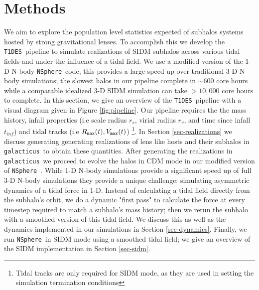 \documentclass[%
 reprint,
 amsmath,
 amssymb,
 aps,
]{revtex4-2}
\def\gal{{\tt galacticus}~}
\def\tides{{\tt T1DES}~}
\def\nsphere{{\tt NSphere}~}
\newcommand{\reffig}[1]{Figure \ref{#1}}
\newcommand{\refsec}[1]{Section \ref{#1}}
\begin{document}
\section{Methods}\label{sec-methods}

We aim to explore the population level statistics expected of subhalos systems hosted by strong gravitational lenses. 
To accomplish this we develop the \tides pipeline to simulate realizations of SIDM subhalos across various tidal fields and under the influence of a tidal field.
We use a modified version of the 1-D N-body \nsphere code, this provides a large speed up over traditional 3-D N-body simulations; the slowest halos in our pipeline complete in $\sim 600$ core hours while a comparable idealized 3-D SIDM simulation can take $> 10,000$ core hours to complete. 
In this section, we give an overview of the \tides pipeline with a visual diagram given in \reffig{fig:pipeline}.
Our pipeline requires the the mass history, infall properties (i.e scale radius $r_s$, virial radius $r_v$, and time since infall $t_{inf}$) and tidal tracks (i.e $R_{\tt max}(t), V_{\tt max}(t)$) 
\footnote{Tidal tracks are only required for SIDM mode, as they are used in setting the simulation termination conditions}. 
In \refsec{sec-realizations} we discuss generating generating realizations of lens like hosts and their subhalos in \gal to obtain these quantities.
After generating the realizations in \gal we proceed to evolve the halos in CDM mode in our modified version of \nsphere.
While 1-D N-body simulations provide a significant speed up of full 3-D N-body simulations they provide a unique challenge: simulating asymmetric dynamics of a tidal force in 1-D.
Instead of calculating a tidal field directly from the subhalo's orbit, we do a dynamic "first pass" to calculate the force at every timestep required to match a subhalo's mass history; then we rerun the subhalo with a smoothed version of this tidal field. 
We discuss this as well as the dynamics implemented in our simulations in \refsec{sec-dynamics}.
Finally, we run \nsphere in SIDM mode using a smoothed tidal field; we give an overview of the SIDM implementation in \refsec{sec-sidm}.
\end{document}

